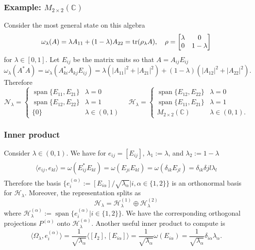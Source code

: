 \documentclass{beamer}
\DeclareMathOperator{\Span}{span}
\begin{document}
\begin{frame}
	\frametitle{Example: $M_{2\times 2}(\mathbb{C})$}
	Consider the most general state on this algebra
	\begin{equation}
		\omega_\lambda(A)=\lambda A_{11} + (1-\lambda) A_{22}=\tr(\rho_\lambda A),\quad\rho=\mqty[\lambda & 0\\0& 1-\lambda]
	\end{equation}
	for $\lambda\in[0,1]$. Let $E_{ij}$ be the matrix units so that $A=A_{ij}E_{ij}$
	\begin{equation*}
		\omega_\lambda(A^*A)=\omega_\lambda(A^*_{ki}A_{kj}E_{ij})=\lambda(|A_{11}|^2+|A_{21}|^2)+(1-\lambda)(|A_{12}|^2+|A_{22}|^2).
	\end{equation*}
	Therefore
	\begin{equation*}
		\mathcal{N}_\lambda=\begin{cases}
		\Span\{E_{11},E_{21}\} & \lambda = 0\\
		\Span\{E_{12},E_{22}\} & \lambda = 1\\
		\{0\} & \lambda\in(0,1)
		\end{cases}\quad
		\mathcal{H}_\lambda=\begin{cases}
		\Span\{E_{12},E_{22}\} & \lambda = 0\\
		\Span\{E_{11},E_{21}\} & \lambda = 1\\
		M_{2\times 2}(\mathbb{C}) & \lambda\in(0,1).
		\end{cases}
	\end{equation*}
\end{frame}

\begin{frame}
	\frametitle{Inner product}
	Consider $\lambda\in(0,1)$. We have for $e_{ij}=[E_{ij}]$, $\lambda_1:=\lambda$, and $\lambda_2:=1-\lambda$
	\begin{align}
	\begin{split}
		\langle e_{ij},e_{kl}\rangle=\omega(E_{ij}^*E_{kl})=\omega(E_{ji}E_{kl})=\omega(\delta_{ik}E_{jl})=\delta_{ik}\delta{jl}\lambda_l
	\end{split}
	\end{align}
	Therefore the basis $\{e_i^{(\alpha)}:=[E_{i\alpha}]/\sqrt{\lambda_\alpha}|i,\alpha\in\{1,2\}\}$ is an orthonormal basis for $\mathcal{H}_\lambda$. Moreover, the representation splits as
	\begin{equation}
		\mathcal{H}_\lambda=\mathcal{H}_\lambda^{(1)}\oplus\mathcal{H}_\lambda^{(2)}
	\end{equation}
	where $\mathcal{H}_\lambda^{(\alpha)}:=\Span\{e_i^{(\alpha)}|i\in\{1,2\}\}$. We have the corresponding orthogonal projections $P^{(\alpha)}$ onto $\mathcal{H}_\lambda^{(\alpha)}$.
	Another useful inner product to compute is
	\begin{equation}
		\langle\Omega_\lambda,e_i^{(\alpha)}\rangle=\frac{1}{\sqrt{\lambda_\alpha}}\langle[I_2],[E_{i\alpha}]\rangle=\frac{1}{\sqrt{\lambda_\alpha}}\omega(E_{i\alpha})=\frac{1}{\sqrt{\lambda_\alpha}}\delta_{i\alpha}\lambda_\alpha.
	\end{equation}
\end{frame}
\end{document}
